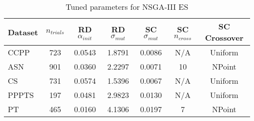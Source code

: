 \begin{table}[ht]
\centering
\caption{Tuned parameters for NSGA-III ES}
\begin{tabular}{lcccccc}
\hline
Dataset & $n_{trials}$ & \acs{RD} $\alpha_{init}$ & \acs{RD} $\sigma_{mut}$ & \acs{SC} $\sigma_{mut}$ & \acs{SC} $n_{cross}$ & \acs{SC} Crossover \\
\hline
CCPP & 723 & 0.0543 & 1.8791 & 0.0086 & N/A & Uniform \\
ASN & 901 & 0.0360 & 2.2297 & 0.0071 & 10 & NPoint \\
CS & 731 & 0.0574 & 1.5396 & 0.0067 & N/A & Uniform \\
PPPTS & 197 & 0.0481 & 2.9823 & 0.0130 & N/A & Uniform \\
PT & 465 & 0.0160 & 4.1306 & 0.0197 & 7 & NPoint \\
\hline
\end{tabular}
\end{table}